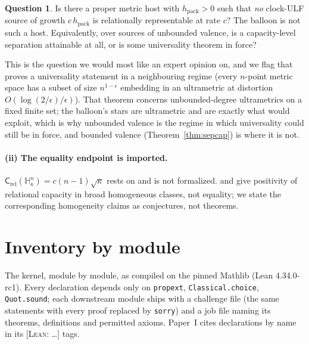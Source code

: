 \documentclass[11pt,a4paper]{article}
\theoremstyle{plain}
\theoremstyle{definition}
\newtheorem{question}[theorem]{Question}
\theoremstyle{remark}
\newcommand{\Capy}{\mathsf{C}}
\newcommand{\hpack}{h_{\mathrm{pack}}}
\newcommand{\Hyp}{\mathbb{H}}
\begin{document}
\begin{question}\label{q:sep}
Is there a proper metric host with $\hpack>0$ such that \emph{no} clock-ULF
source of growth $c\,\hpack$ is relationally representable at rate $c$? The
balloon is not such a host. Equivalently, over sources of unbounded valence, is
a capacity-level separation attainable at all, or is some universality theorem
in force?
\end{question}

This is the question we would most like an expert opinion on, and we flag that
\cite{BLMN} proves a universality statement in a neighbouring regime (every
$n$-point metric space has a subset of size $n^{1-\epsilon}$ embedding in an
ultrametric at distortion $O(\log(2/\epsilon)/\epsilon)$). That theorem
concerns unbounded-degree ultrametrics on a fixed finite set; the balloon's
stars are ultrametric and are exactly what \cite{BLMN} would exploit, which is
why unbounded valence is the regime in which universality could still be in
force, and bounded valence (Theorem~\ref{thm:sepcap}) is where it is not.

\paragraph{(ii) The equality endpoint is imported.}
$\Capy_{\mathrm{rel}}(\Hyp^n_\kappa)=c(n-1)\sqrt{\kappa}$ rests on
\cite{Skenderi} and is not formalized. \cite{Tessera} and \cite{Kerr} give
positivity of relational capacity in broad homogeneous classes, not equality;
we state the corresponding homogeneity claims as conjectures, not theorems.

\section{Inventory by module}\label{sec:inventory}
The kernel, module by module, as compiled on the pinned Mathlib (Lean 4.34.0-rc1). Every declaration depends only on
\texttt{propext}, \texttt{Classical.choice}, \texttt{Quot.sound}; each downstream module ships with a challenge file
(the same statements with every proof replaced by \texttt{sorry}) and a job file naming its theorems, definitions
and permitted axioms. Paper~I cites declarations by name in its [\textsc{Lean}: \ldots] tags.
\end{document}
